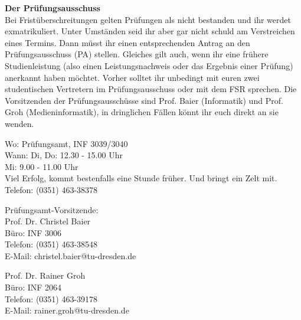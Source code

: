 \textbf{Der Prüfungsausschuss} \\
Bei Fristüberschreitungen gelten Prüfungen als nicht bestanden und ihr werdet exmatrikuliert.
Unter Umständen seid ihr aber gar nicht schuld am Verstreichen eines Termins.
Dann müsst ihr einen entsprechenden Antrag an den Prüfungsausschuss (PA) stellen.
Gleiches gilt auch, wenn ihr eine frühere Studienleistung (also einen Leistungsnachweis oder das Ergebnis einer Prüfung) anerkannt haben möchtet.
Vorher solltet ihr unbedingt mit euren zwei studentischen Vertretern im Prüfungsausschuss oder mit dem FSR sprechen.
Die Vorsitzenden der Prüfungsausschüsse sind Prof. Baier (Informatik) und Prof. Groh (Medieninformatik), in dringlichen Fällen könnt ihr euch direkt an sie wenden.

Wo: Prüfungsamt, INF 3039/3040 \\
Wann: Di, Do: 12.30 - 15.00 Uhr \\
Mi: 9.00 - 11.00 Uhr \\
Viel Erfolg, kommt bestenfalls eine Stunde früher.
Und bringt ein Zelt mit. \\
Telefon: (0351) 463-38378

Prüfungsamt-Vorsitzende: \\
Prof. Dr. Christel Baier \\
Büro: INF 3006 \\
Telefon: (0351) 463-38548 \\
E-Mail: christel.baier@tu-dresden.de

Prof. Dr. Rainer Groh \\
Büro: INF 2064 \\
Telefon: (0351) 463-39178 \\
E-Mail: rainer.groh@tu-dresden.de